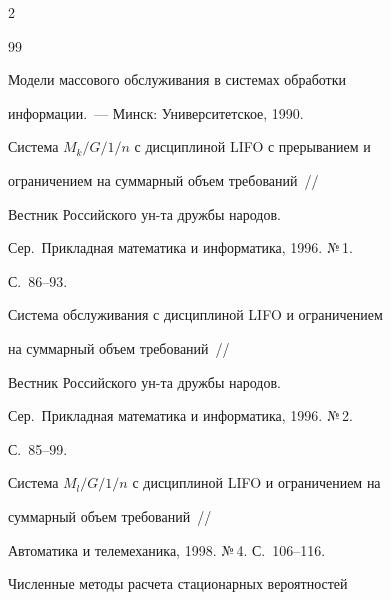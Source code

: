 \begin{multicols}{2}
{{\begin{thebibliography}{99}






Модели массового обслуживания в системах обработки


информации.~--- Минск: Университетское, 1990.











Система $M_k/G/1/n$ с дисциплиной LIFO с прерыванием и


ограничением на суммарный объем требований~//


Вестник Российского ун-та дружбы народов.


Сер.\ Прикладная математика и информатика, 1996. №\,1.


С.~86--93.











Система обслуживания с дисциплиной LIFO и ограничением


на суммарный объем требований~//


Вестник Российского ун-та дружбы народов.


Сер.\ Прикладная математика и информатика, 1996. №\,2.


С.~85--99.











Система $M_l/G/1/n$ с дисциплиной LIFO и ограничением на


суммарный объем требований~//


Автоматика и телемеханика, 1998. №\,4. С.~106--116.











Численные методы расчета стационарных вероятностей



\end{thebibliography}}}
\end{multicols}
